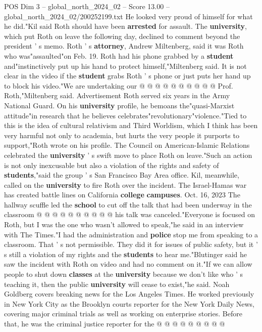\begin{textsample}{POS Dim 3 – global\_north\_2024\_02 – Score 13.00 – global\_north\_2024\_02/200252199.txt}
He looked very proud of himself for what he did."Kil said Roth should have been \textbf{arrested} for assault.
The \textbf{university}, which put Roth on leave the following day, declined to comment beyond the president ' s memo.
Roth ' s \textbf{attorney}, Andrew Miltenberg, said it was Roth who was"assaulted"on Feb. 19.
Roth had his phone grabbed by a \textbf{student} and"instinctively put up his hand to protect himself,"Miltenberg said.
It is not clear in the video if the \textbf{student} grabs Roth ' s phone or just puts her hand up to block his video."We are undertaking our @ @ @ @ @ @ @ @ @ @ Prof.
Roth,"Miltenberg said.
Advertisement Roth served six years in the Army National Guard.
On his \textbf{university} profile, he bemoans the"quasi-Marxist attitude"in research that he believes celebrates"revolutionary"violence."Tied to this is the idea of cultural relativism and Third Worldism, which I think has been very harmful not only to academia, but hurts the very people it purports to support,"Roth wrote on his profile.
The Council on American-Islamic Relations celebrated the \textbf{university} ' s swift move to place Roth on leave."Such an action is not only inexcusable but also a violation of the rights and safety of \textbf{students},"said the group ' s San Francisco Bay Area office.
Kil, meanwhile, called on the \textbf{university} to fire Roth over the incident.
The Israel-Hamas war has created battle lines on California \textbf{college} \textbf{campuses}.
Oct. 16, 2023 The hallway scuffle led the \textbf{school} to cut off the talk that had been underway in the classroom @ @ @ @ @ @ @ @ @ @ his talk was canceled."Everyone is focused on Roth, but I was the one who wasn't allowed to speak,"he said in an interview with The Times."I had the administration and \textbf{police} stop me from speaking to a classroom.
That ' s not permissible.
They did it for issues of public safety, but it ' s still a violation of my rights and the \textbf{students} to hear me."Blutinger said he saw the incident with Roth on video and had no comment on it."If we can allow people to shut down \textbf{classes} at the \textbf{university} because we don't like who ' s teaching it, then the public \textbf{university} will cease to exist,"he said.
Noah Goldberg covers breaking news for the Los Angeles Times.
He worked previously in New York City as the Brooklyn courts reporter for the New York Daily News, covering major criminal trials as well as working on enterprise stories.
Before that, he was the criminal justice reporter for the @ @ @ @ @ @ @ @ @

\end{textsample}
